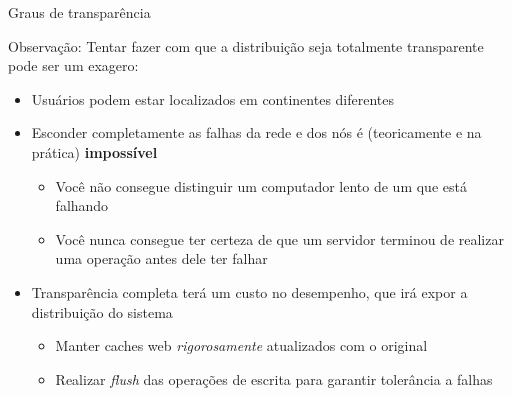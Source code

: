 \documentclass[Ligatures=TeX,table,brazil,svgnames,usetotalslideindicator,compress,10pt]{beamer}
\begin{document}
\begin{frame}{Graus de transparência}
  \small
  \begin{block}{Observação:}
    Tentar fazer com que a distribuição seja totalmente transparente pode ser um exagero:
    \begin{itemize}

    \item<2-> Usuários podem estar localizados em \alert{continentes diferentes}

    \item<3-> \alert{Esconder completamente as falhas} da rede e dos nós é  (teoricamente e na prática) \textbf{impossível}

      \begin{itemize}

      \item Você não consegue distinguir um computador lento de um que está falhando
      \item Você nunca consegue ter certeza de que um servidor terminou de realizar uma operação antes dele ter falhar

      \end{itemize}

    \item<4-> Transparência completa terá um \alert{custo no desempenho}, que irá expor a distribuição do sistema

      \begin{itemize}

      \item Manter caches web \emph{rigorosamente} atualizados com o original
      \item Realizar \textit{flush} das operações de escrita para garantir tolerância a falhas

      \end{itemize}

    \end{itemize}
  \end{block}
\end{frame}
\end{document}
